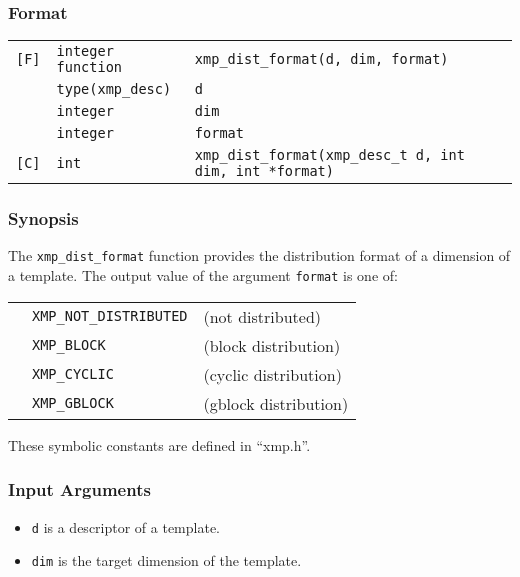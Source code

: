 \subsubsection*{Format}

\begin{tabular}{lll}

\verb![F]!& {\tt integer function}& {\tt xmp\_dist\_format(d, dim, format)}\\
          & {\tt type(xmp\_desc)} & {\tt d}\\
          & {\tt integer} & {\tt dim}\\
          & {\tt integer} & {\tt format}\\

\verb![C]!&  {\tt int}& {\tt xmp\_dist\_format(xmp\_desc\_t d, int dim, int *format)}\\

\end{tabular}

\subsubsection*{Synopsis}

The {\tt xmp\_dist\_format} function provides the distribution format of
a dimension of a template. The output value of the argument {\tt format}
is one of:

\begin{tabular}{lll}
       \hspace{2.5cm} & {\tt XMP\_NOT\_DISTRIBUTED} & (not distributed)\\
                      & {\tt XMP\_BLOCK}  & (block distribution) \\
                      & {\tt XMP\_CYCLIC} & (cyclic distribution) \\
                      & {\tt XMP\_GBLOCK} & (gblock distribution) \\
\end{tabular}

These symbolic constants are defined in ``xmp.h''.

\subsubsection*{Input Arguments}
\begin{itemize}
 \item {\tt d} is a descriptor of a template.
 \item {\tt dim} is the target dimension of the template.
\end{itemize}

